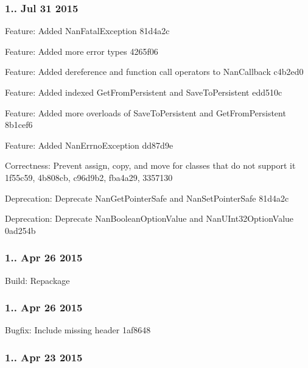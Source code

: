\subsubsection*{1.. Jul 31 2015}


\begin{DoxyItemize}
\item Feature\+: Added {\ttfamily Nan\+Fatal\+Exception} 81d4a2c
\item Feature\+: Added more error types 4265f06
\item Feature\+: Added dereference and function call operators to Nan\+Callback c4b2ed0
\item Feature\+: Added indexed Get\+From\+Persistent and Save\+To\+Persistent edd510c
\item Feature\+: Added more overloads of Save\+To\+Persistent and Get\+From\+Persistent 8b1cef6
\item Feature\+: Added Nan\+Errno\+Exception dd87d9e
\item Correctness\+: Prevent assign, copy, and move for classes that do not support it 1f55c59, 4b808cb, c96d9b2, fba4a29, 3357130
\item Deprecation\+: Deprecate {\ttfamily Nan\+Get\+Pointer\+Safe} and {\ttfamily Nan\+Set\+Pointer\+Safe} 81d4a2c
\item Deprecation\+: Deprecate {\ttfamily Nan\+Boolean\+Option\+Value} and {\ttfamily Nan\+U\+Int32\+Option\+Value} 0ad254b
\end{DoxyItemize}

\subsubsection*{1.. Apr 26 2015}


\begin{DoxyItemize}
\item Build\+: Repackage
\end{DoxyItemize}

\subsubsection*{1.. Apr 26 2015}


\begin{DoxyItemize}
\item Bugfix\+: Include missing header 1af8648
\end{DoxyItemize}

\subsubsection*{1.. Apr 23 2015}


